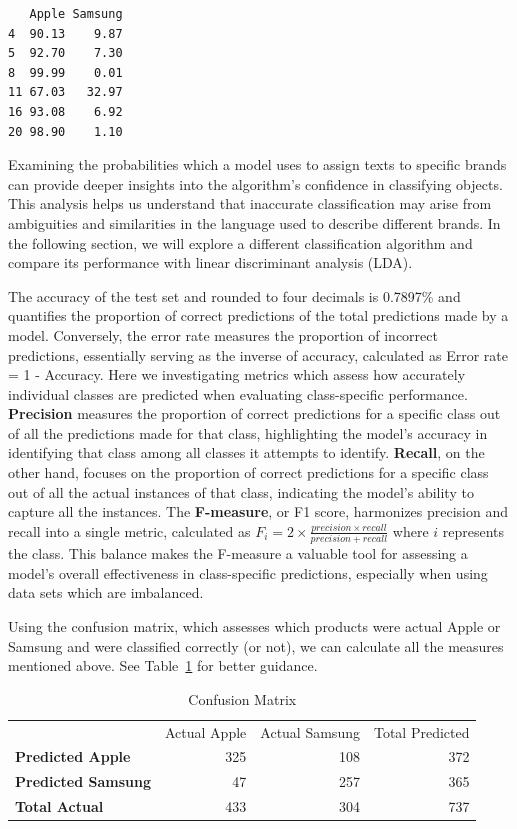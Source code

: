 \begin{verbatim}
   Apple Samsung
4  90.13    9.87
5  92.70    7.30
8  99.99    0.01
11 67.03   32.97
16 93.08    6.92
20 98.90    1.10
\end{verbatim}

Examining the probabilities which a model uses to assign texts to specific
brands can provide deeper insights into the algorithm's confidence in
classifying objects. This analysis helps us understand that
inaccurate classification may arise from ambiguities and similarities in the
language used to describe different brands. In the following section, we
will explore a different classification algorithm and compare its
performance with linear discriminant analysis (LDA).

The accuracy of the test set and rounded to four decimals is
0.7897\% and quantifies the proportion of correct predictions of the
total predictions made by a model. Conversely, the error rate measures
the proportion of incorrect predictions, essentially serving as the
inverse of accuracy, calculated as Error rate = 1 - Accuracy. Here we
investigating metrics which assess how accurately individual classes are
predicted when evaluating class-specific performance. \textbf{Precision} measures
the proportion of correct predictions for a specific class out of all the
predictions made for that class, highlighting the model's accuracy in
identifying that class among all classes it attempts to identify.
\textbf{Recall}, on the other hand, focuses on the proportion of correct
predictions for a specific class out of all the actual instances of that
class, indicating the model's ability to capture all the instances.
The \textbf{F-measure}, or F1 score, harmonizes precision and recall into a
single metric, calculated as
\(F_{i}=2 \times \frac{precision\times recall}{precision+recall}\) where
\(i\) represents the class. This balance makes the F-measure a valuable
tool for assessing a model's overall effectiveness in class-specific
predictions, especially when using data sets which are imbalanced.

Using the confusion matrix, which assesses which
products were actual Apple or Samsung and were classified correctly (or
not), we can calculate all the measures mentioned above. See
Table~\ref{tbl-cfmtable} for better guidance.

\begin{longtable}[t]{>{}l|rr|>{}r}

\caption{\label{tbl-cfmtable}Confusion Matrix}

\tabularnewline

\\
\toprule
 & Actual Apple & Actual Samsung & Total Predicted\\
\midrule
\textbf{Predicted Apple} & 325 & 108 & 372\\
\textbf{Predicted Samsung} & 47 & 257 & 365\\
\midrule
\textbf{Total Actual} & 433 & 304 & 737\\
\bottomrule

\end{longtable}


